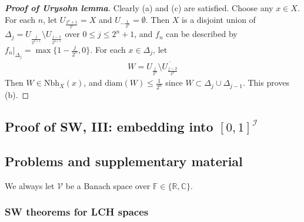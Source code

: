 \documentclass[12pt,b5paper,notitlepage]{article}
\theoremstyle{definition}
\theoremstyle{plain}
\newcommand{\mc}{\mathcal}
\newcommand{\ovl}{\overline}
\newcommand{\scr}{\mathscr}
\newcommand{\Cbb}{\mathbb C}
\newcommand{\Rbb}{\mathbb R}
\newcommand{\Fbb}{\mathbb F}
\newcommand{\Nbh}{\mathrm{Nbh}}
\newcommand{\diam}{\mathrm{diam}}
\numberwithin{equation}{section}
\begin{document}
\begin{proof}[\textbf{Proof of Urysohn lemma}]
Clearly (a) and (c) are satisfied. Choose any $x\in X$. For each $n$, let $U_{\frac {2^n+1}{2^n}}=X$ and $U_{-\frac 1{2^n}}=\emptyset$. Then $X$ is a disjoint  union of $\Delta_j=U_{\frac j{2^{n+1}}}\setminus U_{\frac{j-1}{2^{n+1}}}$ over $0\leq j\leq 2^n+1$, and $f_n$ can be described by $f_n|_{\Delta_j}=\max\{1-\frac j{2^n},0\}$. For each $x\in \Delta_j$, let
\begin{align*}
W=U_{\frac{j}{2^n}}\setminus\ovl{U_{\frac{j-2}{2^n}} }
\end{align*}
Then $W\in\Nbh_X(x)$, and $\diam(W)\leq \frac 1{2^n}$ since $W\subset \Delta_j\cup\Delta_{j-1}$. This proves (b).
\end{proof}
































\hypertarget{beforeindex}{}



\subsection{Proof of SW, III: embedding into $[0,1]^{\scr I}$}



\subsection{Problems and supplementary material}


We always let $\mc V$ be a Banach space over $\Fbb\in\{\Rbb,\Cbb\}$.

\subsubsection{SW theorems for LCH spaces}
\end{document}
